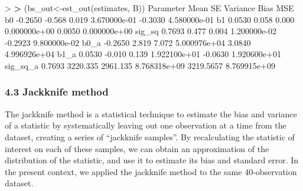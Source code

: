 \documentclass[
]{article}
\newenvironment{Shaded}{\begin{snugshade}}{\end{snugshade}}
\newcommand{\ErrorTok}[1]{\textcolor[rgb]{0.64,0.00,0.00}{\textbf{#1}}}
\newcommand{\FloatTok}[1]{\textcolor[rgb]{0.00,0.00,0.81}{#1}}
\newcommand{\FunctionTok}[1]{\textcolor[rgb]{0.00,0.00,0.00}{#1}}
\newcommand{\NormalTok}[1]{#1}
\newcommand{\OtherTok}[1]{\textcolor[rgb]{0.56,0.35,0.01}{#1}}
\newcommand{\SpecialCharTok}[1]{\textcolor[rgb]{0.00,0.00,0.00}{#1}}
\begin{document}
\begin{Shaded}
\begin{Highlighting}[]
\SpecialCharTok{\textgreater{}} 
\ErrorTok{\textgreater{}}\NormalTok{ (bs\_out}\OtherTok{\textless{}{-}}\FunctionTok{est\_out}\NormalTok{(estimates, B))}
\NormalTok{         Parameter     Mean       SE     Variance      Bias          MSE}
\NormalTok{b0         }\SpecialCharTok{{-}}\FloatTok{0.2650}   \SpecialCharTok{{-}}\FloatTok{0.568}    \FloatTok{0.019} \FloatTok{3.670000e{-}01}   \SpecialCharTok{{-}}\FloatTok{0.3030} \FloatTok{4.580000e{-}01}
\NormalTok{b1          }\FloatTok{0.0530}    \FloatTok{0.058}    \FloatTok{0.000} \FloatTok{0.000000e+00}    \FloatTok{0.0050} \FloatTok{0.000000e+00}
\NormalTok{sig\_sq      }\FloatTok{0.7693}    \FloatTok{0.477}    \FloatTok{0.004} \FloatTok{1.200000e{-}02}   \SpecialCharTok{{-}}\FloatTok{0.2923} \FloatTok{9.800000e{-}02}
\NormalTok{b0\_a       }\SpecialCharTok{{-}}\FloatTok{0.2650}    \FloatTok{2.819}    \FloatTok{7.072} \FloatTok{5.000976e+04}    \FloatTok{3.0840} \FloatTok{4.996926e+04}
\NormalTok{b1\_a        }\FloatTok{0.0530}   \SpecialCharTok{{-}}\FloatTok{0.010}    \FloatTok{0.139} \FloatTok{1.922100e+01}   \SpecialCharTok{{-}}\FloatTok{0.0630} \FloatTok{1.920600e+01}
\NormalTok{sig\_sq\_a    }\FloatTok{0.7693} \FloatTok{3220.335} \FloatTok{2961.135} \FloatTok{8.768318e+09} \FloatTok{3219.5657} \FloatTok{8.769915e+09}
\end{Highlighting}
\end{Shaded}

\hypertarget{jackknife-method}{%
\subsubsection{4.3 Jackknife method}\label{jackknife-method}}

The jackknife method is a statistical technique to estimate the bias and
variance of a statistic by systematically leaving out one observation at
a time from the dataset, creating a series of ``jackknife samples''. By
recalculating the statistic of interest on each of these samples, we can
obtain an approximation of the distribution of the statistic, and use it
to estimate its bias and standard error. In the present context, we
applied the jackknife method to the same 40-observation dataset.
\end{document}
